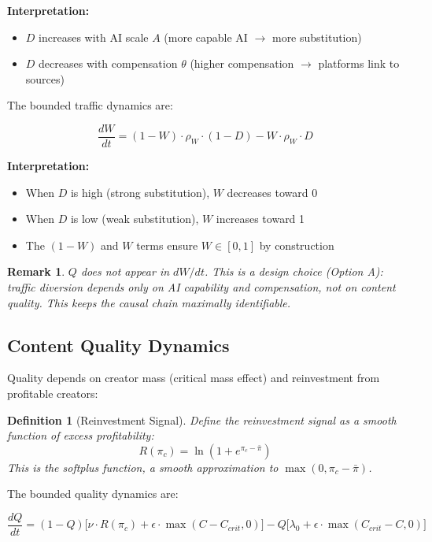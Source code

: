 \documentclass[11pt,a4paper]{article}
\newtheorem{definition}{Definition}
\newtheorem{remark}{Remark}
\begin{document}
\textbf{Interpretation:}
\begin{itemize}
    \item $D$ increases with AI scale $A$ (more capable AI $\rightarrow$ more substitution)
    \item $D$ decreases with compensation $\theta$ (higher compensation $\rightarrow$ platforms link to sources)
\end{itemize}

The bounded traffic dynamics are:

\begin{equation}
\boxed{
\frac{dW}{dt} = (1-W) \cdot \rho_W \cdot (1-D) - W \cdot \rho_W \cdot D
}
\end{equation}

\textbf{Interpretation:}
\begin{itemize}
    \item When $D$ is high (strong substitution), $W$ decreases toward 0
    \item When $D$ is low (weak substitution), $W$ increases toward 1
    \item The $(1-W)$ and $W$ terms ensure $W \in [0,1]$ by construction
\end{itemize}

\begin{remark}
$Q$ does not appear in $dW/dt$. This is a design choice (Option A): traffic diversion depends only on AI capability and compensation, not on content quality. This keeps the causal chain maximally identifiable.
\end{remark}

\subsection{Content Quality Dynamics}

Quality depends on creator mass (critical mass effect) and reinvestment from profitable creators:

\begin{definition}[Reinvestment Signal]
Define the reinvestment signal as a smooth function of excess profitability:
\begin{equation}
R(\pi_c) = \ln(1 + e^{\pi_c - \bar{\pi}})
\end{equation}
This is the softplus function, a smooth approximation to $\max(0, \pi_c - \bar{\pi})$.
\end{definition}

The bounded quality dynamics are:

\begin{equation}
\boxed{
\frac{dQ}{dt} = (1-Q)\Big[\nu \cdot R(\pi_c) + \epsilon \cdot \max(C - C_{crit}, 0)\Big] - Q\Big[\lambda_0 + \epsilon \cdot \max(C_{crit} - C, 0)\Big]
}
\end{equation}
\end{document}
